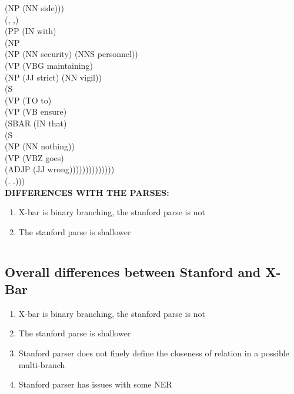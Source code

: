 \documentclass[11pt,a4paper]{article}
\begin{document}
\begin{enumerate}
	            (NP (NN side)))\\
	          (, ,)\\
	          (PP (IN with)\\
	            (NP\\
	              (NP (NN security) (NNS personnel))\\
	              (VP (VBG maintaining)\\
	                (NP (JJ strict) (NN vigil))\\
	                (S\\
	                  (VP (TO to)\\
	                    (VP (VB ensure)\\
	                      (SBAR (IN that)\\
	                        (S\\
	                          (NP (NN nothing))\\
	                          (VP (VBZ goes)\\
	                            (ADJP (JJ wrong))))))))))))))\\
	    (. .)))\\	
	\textbf{DIFFERENCES WITH THE PARSES:}\\
	\begin{enumerate}
		\item X-bar is binary branching, the stanford parse is not
		\item The stanford parse is shallower
	\end{enumerate}
	$ $\\
	$ $\\
	
	\end{enumerate}
	\subsection{Overall differences between Stanford and X-Bar}
	\begin{enumerate}
		\item X-bar is binary branching, the stanford parse is not
		\item The stanford parse is shallower
		\item Stanford parser does not finely define the closeness of relation in a possible multi-branch
		\item Stanford parser has issues with some NER
	\end{enumerate}		
	
\end{document}
